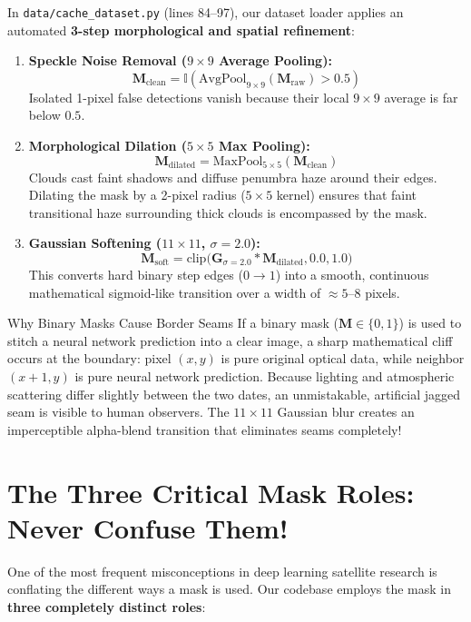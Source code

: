In \texttt{data/cache\_dataset.py} (lines 84--97), our dataset loader applies an automated \textbf{3-step morphological and spatial refinement}:
\begin{enumerate}
    \item \textbf{Speckle Noise Removal ($9 \times 9$ Average Pooling):}
    \begin{equation}
    \mathbf{M}_{\text{clean}} = \mathbb{I}\left( \text{AvgPool}_{9\times 9}(\mathbf{M}_{\text{raw}}) > 0.5 \right)
    \end{equation}
    Isolated 1-pixel false detections vanish because their local $9 \times 9$ average is far below $0.5$.
    \item \textbf{Morphological Dilation ($5 \times 5$ Max Pooling):}
    \begin{equation}
    \mathbf{M}_{\text{dilated}} = \text{MaxPool}_{5\times 5}(\mathbf{M}_{\text{clean}})
    \end{equation}
    Clouds cast faint shadows and diffuse penumbra haze around their edges. Dilating the mask by a 2-pixel radius ($5 \times 5$ kernel) ensures that faint transitional haze surrounding thick clouds is encompassed by the mask.
    \item \textbf{Gaussian Softening ($11 \times 11$, $\sigma = 2.0$):}
    \begin{equation}
    \mathbf{M}_{\text{soft}} = \text{clip}\big(\mathbf{G}_{\sigma=2.0} * \mathbf{M}_{\text{dilated}}, 0.0, 1.0\big)
    \end{equation}
    This converts hard binary step edges ($0 \to 1$) into a smooth, continuous mathematical sigmoid-like transition over a width of $\approx 5\text{--}8$ pixels.
\end{enumerate}

\begin{warningbox}{Why Binary Masks Cause Border Seams}
If a binary mask ($\mathbf{M} \in \{0, 1\}$) is used to stitch a neural network prediction into a clear image, a sharp mathematical cliff occurs at the boundary: pixel $(x, y)$ is pure original optical data, while neighbor $(x+1, y)$ is pure neural network prediction. Because lighting and atmospheric scattering differ slightly between the two dates, an unmistakable, artificial jagged seam is visible to human observers. The $11 \times 11$ Gaussian blur creates an imperceptible alpha-blend transition that eliminates seams completely!
\end{warningbox}

\section{The Three Critical Mask Roles: Never Confuse Them!}
One of the most frequent misconceptions in deep learning satellite research is conflating the different ways a mask is used. Our codebase employs the mask in \textbf{three completely distinct roles}:


